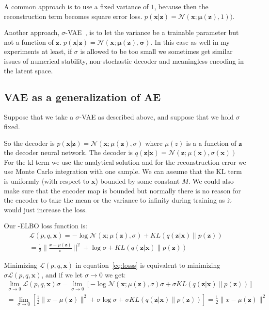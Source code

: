 \documentclass[11pt, a4paper]{report}
\theoremstyle{plain}
\theoremstyle{definition}
\theoremstyle{remark}
\newcommand{\x}{\mathbf{x}}
\newcommand{\z}{\mathbf{z}}
\newcommand{\LL}{\mathcal{L}}
\newcommand{\NN}{\mathcal{N}}
\newcommand{\bv}[1]{\boldsymbol{#1}}
\begin{document}
A common approach is to use a fixed variance of $1$, because then the
reconstruction term becomes square error loss.
$p(\x | \z) = \NN(\x ; \bv{\mu}(\z), 1))$.

Another approach, $\sigma$-VAE~\cite{rybkin2021simple}, is to let the variance
be a trainable parameter but not a function of $\z$.
$p(\x | \z) = \NN(\x ; \bv{\mu}(\z), \bv{\sigma})$.
In this case as well in my experiments at least, if $\sigma$ is allowed to be
too small we sometimes get similar issues of numerical stability, 
non-stochastic decoder and meaningless 
encoding in the latent
space.

\subsection{VAE as a generalization of AE}
Suppose that we take a $\sigma$-VAE as described above, and suppose that we hold
$\sigma$ fixed.

So the decoder is $p(\x | \z) = \NN(\x ; \mu(\z), \sigma)$ where $\mu(z)$ is a a
function of $\z$ the decoder neural network. The decoder is $q(\z | \x) = \NN(\z
; \mu(\x), \sigma(\x))$ For the kl-term we use the analytical solution and for
the reconstruction error we use Monte Carlo integration with one sample. We can
assume that the KL term is uniformly (with respect to $\x$) bounded by some
constant $M$. We could also make sure that the encoder map is bounded but
normally there is no reason for the encoder to take the mean or the variance to
infinity during training as it would just increase the loss.

Our -ELBO loss function is:
\begin{equation}
\begin{aligned}
\LL(p,q, \x) = -\log \NN(\x; \mu(\z), \sigma) + KL(q(\z | \x) \| p(\z)) \\
= \frac{1}{2}\|\frac{x - \mu(\z)}{\sigma}\|^2 + \log \sigma + KL(q(\z | \x) \| p(\z))
\end{aligned}
\label{eq:losss}
\end{equation}

Minimizing $\LL(p,q,\x)$ in equation~\ref{eq:losss} is equivalent to minimizing 
$\sigma \LL(p,q,\x)$, and if we let $\sigma \to 0$ we get:
\begin{equation}
\begin{aligned}
\lim_{\sigma \rightarrow 0} \LL(p,q, \x) \sigma 
= \lim_{\sigma \to 0}[ -\log \NN(\x; \mu(\z), \sigma) \sigma + \sigma KL(q(\z |
\x) \| p(\z))] \\
= \lim_{\sigma \to 0} [\frac{1}{2}\|x - \mu(\z)\|^2 + \sigma \log \sigma  +
\sigma KL(q(\z | \x) \| p(\z))] = 
\frac{1}{2}\|x - \mu(\z)\|^2
\end{aligned}
\label{eq:lossss}
\end{equation}
\end{document}
